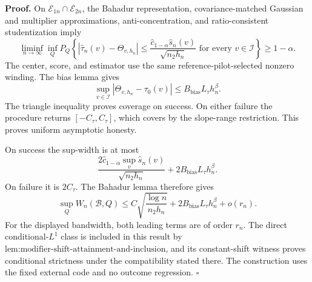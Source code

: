 \textbf{Proof.}
On \(\mathcal E_{1n}\cap\mathcal E_{2n}\), the Bahadur representation, covariance-matched Gaussian and multiplier approximations, anti-concentration, and ratio-consistent studentization imply
\[
 \liminf_{n\to\infty}\inf_QP_Q\left\{
 |\widehat\tau_n(v)-\Theta_{v,h_n}|
 \le\frac{\widehat c_{1-\alpha}\widehat s_n(v)}{\sqrt{n_2h_n}}
 \text{ for every }v\in\mathcal I\right\}\ge1-\alpha. \tag{1}
\]
The center, score, and estimator use the same reference-pilot-selected nonzero winding. The bias lemma gives
\[
 \sup_{v\in\mathcal I}|\Theta_{v,h_n}-\tau_0(v)|
 \le B_{\mathrm{bias}}L_\tau h_n^\beta. \tag{2}
\]
The triangle inequality proves coverage on success. On either failure the procedure returns \([-C_\tau,C_\tau]\), which covers by the slope-range restriction. This proves uniform asymptotic honesty.

On success the sup-width is at most
\[
 \frac{2\widehat c_{1-\alpha}\sup_v\widehat s_n(v)}{\sqrt{n_2h_n}}
 +2B_{\mathrm{bias}}L_\tau h_n^\beta. \tag{3}
\]
On failure it is \(2C_\tau\). The Bahadur lemma therefore gives
\[
 \sup_QW_n(\mathcal B,Q)
 \le C\sqrt{\frac{\log n}{n_2h_n}}
 +2B_{\mathrm{bias}}L_\tau h_n^\beta+o(r_n). \tag{4}
\]
For the displayed bandwidth, both leading terms are of order \(r_n\). The direct conditional-\(L^1\) class is included in this result by \(\text{lem:modifier-shift-attainment-and-inclusion}\), and its constant-shift witness proves conditional strictness under the compatibility stated there. The construction uses the fixed external code and no outcome regression. \(\square\)